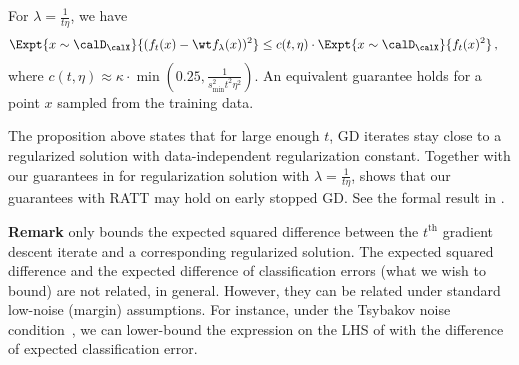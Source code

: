 \begin{prop}[informal] \label{prop:early_stop}
% 
For $\lambda = \frac{1}{t\eta}$, we have 
\begin{align*}
    \Expt{x \sim \calD_\calX}{(f_t(x) - \wt f_\lambda(x))^2} &\le c(t,\eta) \cdot \Expt{x \sim \calD_\calX}{f_t(x)^2} \,, %
\end{align*}
where $c(t, \eta) \approx \kappa \cdot \min( 0.25, \frac{1}{s_\text{min}^2 t^2 \eta^2})$.
An equivalent guarantee holds for a point $x$ 
sampled from the training data. 
\end{prop} 




The proposition above states 
that for large enough $t$, 
GD iterates stay close
to a regularized solution 
with data-independent 
regularization constant. 
Together with our guarantees in  
for regularization solution with $\lambda = \frac{1}{t\eta}$, 
 shows that our guarantees with RATT 
may hold on early stopped GD. 
See the formal result 
in . 


\textbf{Remark {} {}} 
 only bounds the expected squared difference between the $t^{\text{th}}$ gradient descent iterate and a corresponding regularized solution. 
The expected squared difference
and the expected difference
of classification errors
(what we wish to bound)
are not related, in general.
However, they can be related 
under standard low-noise 
(margin) assumptions.
For instance, under the Tsybakov noise condition~\citep{tsybakov1997nonparametric, yao2007early}, we can lower-bound 
the expression on the LHS 
of  
with the difference 
of expected classification error. 

